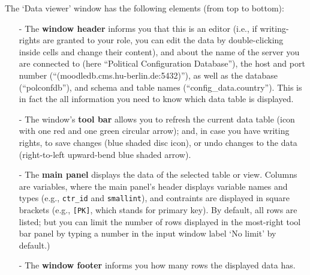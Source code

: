 The `Data viewer' window has the following elements (from top to bottom):
\begin{itemize}
\item[-] The {\bf window header} informs you that this is an editor (i.e., if writing-rights are granted to your role, you can edit the data by double-clicking inside cells and change their content), and about the name of the server you are connected to (here ``Political Configuration Database''), the host and port number (``(moodledb.cms.hu-berlin.de:5432)''), as well as the database (``polconfdb''), and schema and table names (``config\_data.country''). This is in fact the all information you need to know which data table is displayed.

\item[-] The window's {\bf tool bar} allows you to refresh the current data table (icon with one red and one green circular arrow); and, in case you have writing rights, to save changes (blue shaded disc icon), or undo changes to the data (right-to-left upward-bend blue shaded arrow). 

\item[-] The {\bf main panel} displays the data of the selected table or view. 
Columns are variables, where the main panel's header displays variable names and types (e.g., \texttt{ctr\_id} and \texttt{smallint}), and contraints are displayed in square brackets (e.g., \texttt{[PK]}, which stands for primary key).
By default, all rows are listed; but you can limit the number of rows displayed in the most-right tool bar panel by typing a number in the input window label `No limit' by default.) 

\item[-] The {\bf window footer} informs you how many rows the displayed data has.
\end{itemize}
